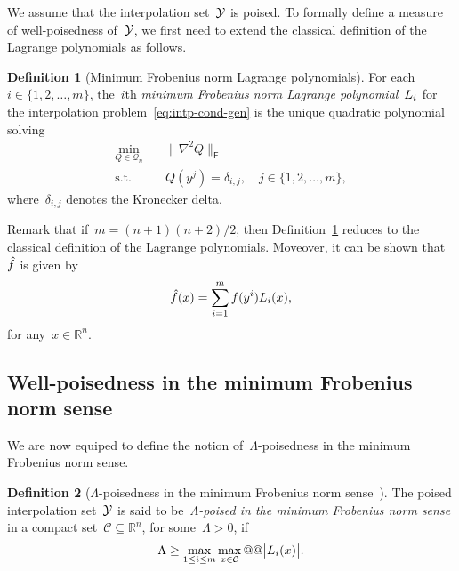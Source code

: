 \documentclass[draft]{article}
\numberwithin{equation}{section}
\theoremstyle{definition}
\newtheorem{definition}{Definition}[section]
\theoremstyle{plain}
\newcommand*{\abs}[2][]{#1\lvert#2#1\rvert}
\newcommand*{\lagp}[1][]{L\ifblank{#1}{}{_{#1}}}
\newcommand*{\norm}[2][]{#1\lVert#2#1\rVert}
\newcommand*{\obj}{f}
\newcommand*{\objm}[1][]{\hat{\obj}\ifblank{#1}{}{^{#1}}}
\newcommand*{\qpoly}{\mathcal{Q}_n}
\newcommand*{\R}{\mathbb{R}}
\newcommand*{\set}[2][]{#1\{#2#1\}}
\newcommand*{\xpt}[1][]{\mathcal{Y}\ifblank{#1}{}{^{#1}}}
\begin{document}
We assume that the interpolation set~$\xpt$ is poised.
To formally define a measure of well-poisedness of~$\xpt$, we first need to extend the classical definition of the Lagrange polynomials as follows.

\begin{definition}[Minimum Frobenius norm Lagrange polynomials]
    \label{def:min-norm-lagp}
    For each~$i \in \set{1, 2, \dots, m}$, the~$i$th \emph{minimum Frobenius norm Lagrange polynomial}~$\lagp[i]$ for the interpolation problem~\eqref{eq:intp-cond-gen} is the unique quadratic polynomial solving
    \begin{equation*}
        \begin{aligned}
            \min_{Q \in \qpoly} & \quad \norm[\big]{\nabla^2 Q}_{\mathsf{F}}\\
            \text{s.t.}         & \quad Q(y^j) = \delta_{i, j}, \quad j \in \set{1, 2, \dots, m},
        \end{aligned}
    \end{equation*}
    where~$\delta_{i, j}$ denotes the Kronecker delta.
\end{definition}

Remark that if~$m = (n + 1) (n + 2) / 2$, then Definition~\ref{def:min-norm-lagp} reduces to the classical definition of the Lagrange polynomials.
Moveover, it can be shown that~$\objm$ is given by
\begin{equation*}
    \objm(x) = \sum_{i = 1}^m \obj(y^i) \lagp[i](x),
\end{equation*}
for any~$x \in \R^n$.

\subsection{Well-poisedness in the minimum Frobenius norm sense}

We are now equiped to define the notion of~$\Lambda$-poisedness in the minimum Frobenius norm sense.

\begin{definition}[$\Lambda$-poisedness in the minimum Frobenius norm sense~{\cite[Definition~5.6]{Conn_Scheinberg_Vicente_2009}}]
    \label{def:lambda-p}
    The poised interpolation set~$\xpt$ is said to be~\emph{$\Lambda$-poised in the minimum Frobenius norm sense} in a compact set~$\mathcal{C} \subseteq \R^n$, for some~$\Lambda > 0$, if
    \begin{equation*}
        \Lambda \ge \max_{1 \le i \le m} \max_{x \in \mathcal{C}} @@ \abs[\big]{\lagp[i](x)}.
    \end{equation*}
\end{definition}
\end{document}
